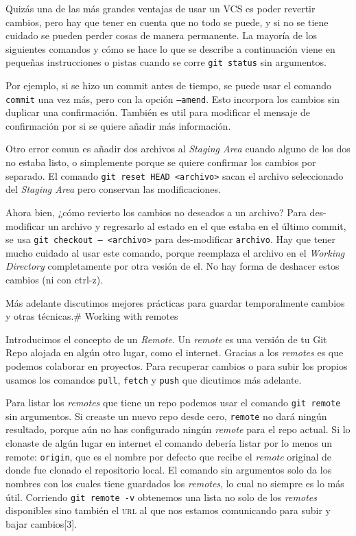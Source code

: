 \documentclass[spanish, 12pt, a4paper]{article}
\begin{document}
Quizás una de las más grandes ventajas de usar un VCS es poder revertir
cambios, pero hay que tener en cuenta que no todo se puede, y si no se
tiene cuidado se pueden perder cosas de manera permanente. La mayoría de
los siguientes comandos y cómo se hace lo que se describe a continuación
viene en pequeñas instrucciones o pistas cuando se corre
\passthrough{\lstinline!git status!} sin argumentos.

Por ejemplo, si se hizo un commit antes de tiempo, se puede usar el
comando \passthrough{\lstinline!commit!} una vez más, pero con la opción
\passthrough{\lstinline!–amend!}. Esto incorpora los cambios sin
duplicar una confirmación. También es util para modificar el mensaje de
confirmación por si se quiere añadir más información.

Otro error comun es añadir dos archivos al \emph{Staging Area} cuando
alguno de los dos no estaba listo, o simplemente porque se quiere
confirmar los cambios por separado. El comando
\passthrough{\lstinline!git reset HEAD <archivo>!} sacan el archivo
seleccionado del \emph{Staging Area} pero conservan las modificaciones.

Ahora bien, ¿cómo revierto los cambios no deseados a un archivo? Para
des-modificar un archivo y regresarlo al estado en el que estaba en el
último commit, se usa \passthrough{\lstinline!git checkout – <archivo>!}
para des-modificar \passthrough{\lstinline!archivo!}. Hay que tener
mucho cuidado al usar este comando, porque reemplaza el archivo en el
\emph{Working Directory} completamente por otra vesión de el. No hay
forma de deshacer estos cambios (ni con ctrl-z).

Más adelante discutimos mejores prácticas para guardar temporalmente
cambios y otras técnicas.\# Working with remotes

Introducimos el concepto de un \emph{Remote}. Un \emph{remote} es una
versión de tu Git Repo alojada en algún otro lugar, como el internet.
Gracias a los \emph{remotes} es que podemos colaborar en proyectos. Para
recuperar cambios o para subir los propios usamos los comandos
\passthrough{\lstinline!pull!}, \passthrough{\lstinline!fetch!} y
\passthrough{\lstinline!push!} que dicutimos más adelante.

Para listar los \emph{remotes} que tiene un repo podemos usar el comando
\passthrough{\lstinline!git remote!} sin argumentos. Si creaste un nuevo
repo desde cero, \passthrough{\lstinline!remote!} no dará ningún
resultado, porque aún no has configurado ningún \emph{remote} para el
repo actual. Si lo clonaste de algún lugar en internet el comando
debería listar por lo menos un remote: \passthrough{\lstinline!origin!},
que es el nombre por defecto que recibe el \emph{remote} original de
donde fue clonado el repositorio local. El comando sin argumentos solo
da los nombres con los cuales tiene guardados los \emph{remotes}, lo
cual no siempre es lo más útil. Corriendo
\passthrough{\lstinline!git remote -v!} obtenemos una lista no solo de
los \emph{remotes} disponibles sino también el \textsc{url} al que nos
estamos comunicando para subir y bajar cambios{[}3{]}.
\end{document}
